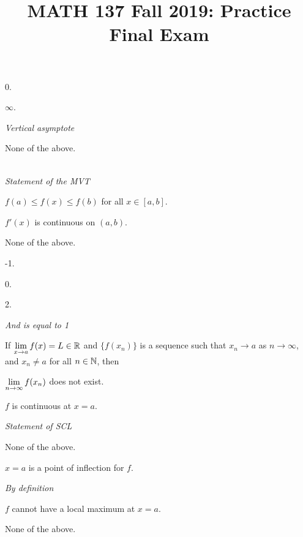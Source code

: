 
\title{MATH 137 Fall 2019: Practice Final Exam}


\thispagestyle{firstpage}
\textbf{\@title}


\begin{choices}
  \item 0.
  \item $\infty$.
  \item {} \emph{Vertical asymptote}
  \item None of the above.
\end{choices}
\begin{choices}
  \item {} \\
  \emph{Statement of the MVT}
  \item $f(a) \leq f(x) \leq f(b)$ for all $x\in[a,b]$.
  \item $f'(x)$ is continuous on $(a,b)$.
  \item None of the above.
\end{choices}
\begin{choices}
  \item -1.
  \item 0.
  \item 2.
  \item {} \emph{And is equal to 1}
\end{choices}
\begin{prob}
  If $\displaystyle\lim_{x\to a} f(x) = L \in \mathbb{R}$ and $\{f(x_n)\}$ is a sequence such that
  $x_n \to a$ as $n \to \infty$, and $x_n \neq a$ for all $n \in \mathbb{N}$, then
\end{prob}
\begin{choices}
  \item $\displaystyle\lim_{n\to\infty}f(x_n)$ does not exist.
  \item $f$ is continuous at $x=a$.
  \item {} \emph{Statement of SCL}
  \item None of the above.
\end{choices}
\begin{choices}
  \item $x=a$ is a point of inflection for $f$.
  \item {} \emph{By definition}
  \item $f$ cannot have a local maximum at $x=a$.
  \item None of the above.
\end{choices}


